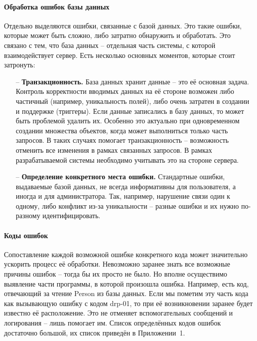 \documentclass[a4paper,article]{article}
\begin{document}
\begin{sloppypar}
    \paragraph{Обработка ошибок базы данных}

    Отдельно выделяются ошибки, связанные с базой данных. Это такие ошибки, которые может быть сложно, либо затратно обнаружить и обработать. Это связано с тем, что база данных -- отдельная часть системы, с которой взаимодействует сервер. Есть несколько основных моментов, которые стоит затронуть:

    \begin{itemize}[nolistsep]
        \item[--] \textbf{Транзакционность.} База данных хранит данные -- это её основная задача. Контроль корректности вводимых данных на её стороне возможен либо частичный (например, уникальность полей), либо очень затратен в создании и поддержке (триггеры). Если данные записались в базу данных, то может быть проблемой удалить их. Особенно это актуально при одновременном создании множества объектов, когда может выполниться только часть запросов. В таких случаях помогает транзакционность -- возможность отменить все изменения в рамках связанных запросов. В рамках разрабатываемой системы необходимо учитывать это на стороне сервера.
        \item[--] \textbf{Определение конкретного места ошибки.} Стандартные ошибки, выдаваемые базой данных, не всегда информативны для пользователя, а иногда и для администратора. Так, например, нарушение связи один к одному, либо конфликт из-за уникальности -- разные ошибки и их нужно по-разному идентифицировать.
    \end{itemize}

    \paragraph{Коды ошибок}\label{Проектирование сервера. Коды ошибок}

    Сопоставление каждой возможной ошибке конкретного кода может значительно ускорить процесс её обработки. Невозможно заранее знать все возможные причины ошибок -- тогда бы их просто не было. Но вполне осуществимо выявление части программы, в которой произошла ошибка. Например, есть код, отвечающий за чтение Person из базы данных. Если мы пометим эту часть кода как вызывающую ошибку с кодом drp-01, то при её возникновении заранее будет известно её расположение. Это не отменяет вспомогательных сообщений и логирования -- лишь помогает им. Список определённых кодов ошибок достаточно большой, их список приведён в Приложении~1.


\end{sloppypar}
\end{document}
